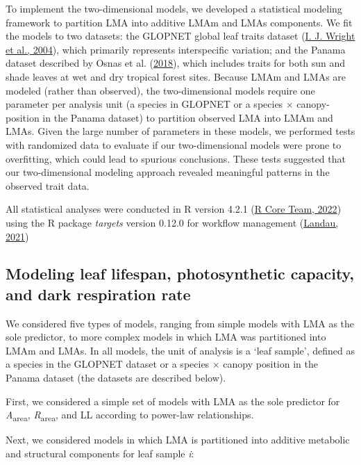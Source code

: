 \documentclass[
  12pt,
  letterpaper,
  DIV=11,
  numbers=noendperiod]{scrartcl}
\begin{document}
To implement the two-dimensional models, we developed a statistical
modeling framework to partition LMA into additive LMAm and LMAs
components. We fit the models to two datasets: the GLOPNET global leaf
traits dataset (\protect\hyperlink{ref-Wright2004a}{I. J. Wright et al.,
2004}), which primarily represents interspecific variation; and the
Panama dataset described by Osnas et al.
(\protect\hyperlink{ref-Osnas2018}{2018}), which includes traits for
both sun and shade leaves at wet and dry tropical forest sites. Because
LMAm and LMAs are modeled (rather than observed), the two-dimensional
models require one parameter per analysis unit (a species in GLOPNET or
a species \(\times\) canopy-position in the Panama dataset) to partition
observed LMA into LMAm and LMAs. Given the large number of parameters in
these models, we performed tests with randomized data to evaluate if our
two-dimensional models were prone to overfitting, which could lead to
spurious conclusions. These tests suggested that our two-dimensional
modeling approach revealed meaningful patterns in the observed trait
data.

All statistical analyses were conducted in R version 4.2.1
(\protect\hyperlink{ref-RCoreTeam2022}{R Core Team, 2022}) using the R
package \emph{targets} version 0.12.0 for workflow management
(\protect\hyperlink{ref-Landau2021}{Landau, 2021})

\hypertarget{modeling-leaf-lifespan-photosynthetic-capacity-and-dark-respiration-rate}{%
\subsection{Modeling leaf lifespan, photosynthetic capacity, and dark
respiration
rate}\label{modeling-leaf-lifespan-photosynthetic-capacity-and-dark-respiration-rate}}

We considered five types of models, ranging from simple models with LMA
as the sole predictor, to more complex models in which LMA was
partitioned into LMAm and LMAs. In all models, the unit of analysis is a
`leaf sample', defined as a species in the GLOPNET dataset or a species
\(\times\) canopy position in the Panama dataset (the datasets are
described below).

First, we considered a simple set of models with LMA as the sole
predictor for \emph{A}\textsubscript{area},
\emph{R}\textsubscript{area}, and LL according to power-law
relationships.

Next, we considered models in which LMA is partitioned into additive
metabolic and structural components for leaf sample \emph{i}:
\end{document}
